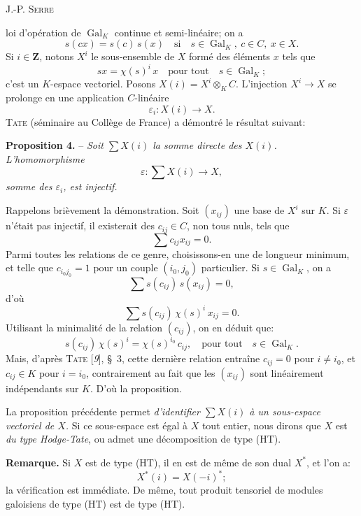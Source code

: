 \begin{center}\small J.-P. \textsc{Serre}\end{center}
loi d’opération de $\operatorname{Gal}_K$ continue et semi-linéaire; on a
\[
s(cx)=s(c)\,s(x)\quad\text{si}\quad s\in\operatorname{Gal}_K,\ c\in C,\ x\in X.
\]
Si $i\in\mathbf{Z}$, notons $X^i$ le sous-ensemble de $X$ formé des éléments $x$ tels que
\[
sx=\chi(s)^i\,x\quad\text{pour tout}\quad s\in\operatorname{Gal}_K;
\]
c’est un $K$-espace vectoriel. Posons $X(i)=X^i\otimes_K C$. L’injection $X^i\to X$ se prolonge en une application $C$-linéaire
\[
\varepsilon_i:X(i)\to X.
\]
\textsc{Tate} (séminaire au Collège de France) a démontré le résultat suivant:

\textbf{Proposition 4.} -- \textit{Soit $\sum X(i)$ la somme directe des $X(i)$. L’homomorphisme}
\[
\varepsilon:\sum X(i)\to X,
\]
\textit{somme des $\varepsilon_i$, est injectif.}

Rappelons brièvement la démonstration. Soit $(x_{ij})$ une base de $X^i$ sur $K$. Si $\varepsilon$ n’était pas injectif, il existerait des $c_{ij}\in C$, non tous nuls, tels que
\[
\sum c_{ij}x_{ij}=0.
\]
Parmi toutes les relations de ce genre, choisissons-en une de longueur minimum, et telle que $c_{i_0j_0}=1$ pour un couple $(i_0,j_0)$ particulier. Si $s\in\operatorname{Gal}_K$, on a
\[
\sum s(c_{ij})\,s(x_{ij})=0,
\]
d’où
\[
\sum s(c_{ij})\,\chi(s)^i\,x_{ij}=0.
\]
Utilisant la minimalité de la relation $(c_{ij})$, on en déduit que:
\[
s(c_{ij})\,\chi(s)^i=\chi(s)^{i_0}\,c_{ij},\quad\text{pour tout}\quad s\in\operatorname{Gal}_K.
\]
Mais, d’après \textsc{Tate} [\textit{9}], \S~3, cette dernière relation entraîne $c_{ij}=0$ pour $i\ne i_0$, et $c_{ij}\in K$ pour $i=i_0$, contrairement au fait que les $(x_{ij})$ sont linéairement indépendants sur $K$. D’où la proposition.

La proposition précédente permet \textit{d’identifier $\sum X(i)$ à un sous-espace vectoriel de $X$.} Si ce sous-espace est égal à $X$ tout entier, nous dirons que $X$ est \textit{du type Hodge-Tate}, ou admet une décomposition de type (HT).

\textbf{Remarque.} Si $X$ est de type (HT), il en est de même de son dual $X^*$, et l’on a:
\[
X^*(i)=X(-i)^*;
\]
la vérification est immédiate. De même, tout produit tensoriel de modules galoisiens de type (HT) est de type (HT).
